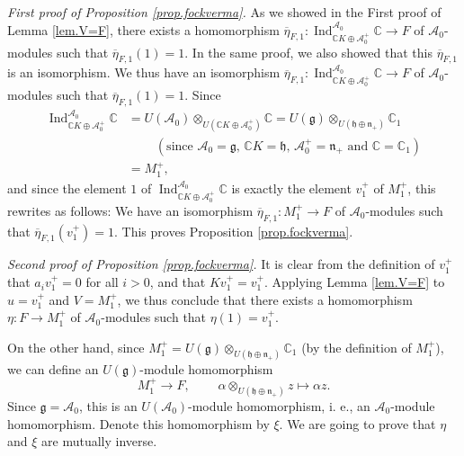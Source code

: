 \documentclass[etingof-lie.tex]{subfiles}
\begin{document}
\textit{First proof of Proposition \ref{prop.fockverma}.} As we showed in the
First proof of Lemma \ref{lem.V=F}, there exists a homomorphism $\overline
{\eta}_{F,1}:\operatorname*{Ind}\nolimits_{\mathbb{C}K\oplus\mathcal{A}%
_{0}^{+}}^{\mathcal{A}_{0}}\mathbb{C}\rightarrow F$ of $\mathcal{A}_{0}%
$-modules such that $\overline{\eta}_{F,1}\left(  1\right)  =1$. In the same
proof, we also showed that this $\overline{\eta}_{F,1}$ is an isomorphism. We
thus have an isomorphism $\overline{\eta}_{F,1}:\operatorname*{Ind}%
\nolimits_{\mathbb{C}K\oplus\mathcal{A}_{0}^{+}}^{\mathcal{A}_{0}}%
\mathbb{C}\rightarrow F$ of $\mathcal{A}_{0}$-modules such that $\overline
{\eta}_{F,1}\left(  1\right)  =1$. Since%
\begin{align*}
\operatorname*{Ind}\nolimits_{\mathbb{C}K\oplus\mathcal{A}_{0}^{+}%
}^{\mathcal{A}_{0}}\mathbb{C}  &  =U\left(  \mathcal{A}_{0}\right)
\otimes_{U\left(  \mathbb{C}K\oplus\mathcal{A}_{0}^{+}\right)  }%
\mathbb{C}=U\left(  \mathfrak{g}\right)  \otimes_{U\left(  \mathfrak{h}%
\oplus\mathfrak{n}_{+}\right)  }\mathbb{C}_{1}\\
&  \ \ \ \ \ \ \ \ \ \ \left(  \text{since }\mathcal{A}_{0}=\mathfrak{g}%
\text{, }\mathbb{C}K=\mathfrak{h}\text{, }\mathcal{A}_{0}^{+}=\mathfrak{n}%
_{+}\text{ and }\mathbb{C}=\mathbb{C}_{1}\right) \\
&  =M_{1}^{+},
\end{align*}
and since the element $1$ of $\operatorname*{Ind}\nolimits_{\mathbb{C}%
K\oplus\mathcal{A}_{0}^{+}}^{\mathcal{A}_{0}}\mathbb{C}$ is exactly the
element $v_{1}^{+}$ of $M_{1}^{+}$, this rewrites as follows: We have an
isomorphism $\overline{\eta}_{F,1}:M_{1}^{+}\rightarrow F$ of $\mathcal{A}%
_{0}$-modules such that $\overline{\eta}_{F,1}\left(  v_{1}^{+}\right)  =1$.
This proves Proposition \ref{prop.fockverma}.

\textit{Second proof of Proposition \ref{prop.fockverma}.} It is clear from
the definition of $v_{1}^{+}$ that $a_{i}v_{1}^{+}=0$ for all $i>0$, and that
$Kv_{1}^{+}=v_{1}^{+}$. Applying Lemma \ref{lem.V=F} to $u=v_{1}^{+}$ and
$V=M_{1}^{+}$, we thus conclude that there exists a homomorphism
$\eta:F\rightarrow M_{1}^{+}$ of $\mathcal{A}_{0}$-modules such that
$\eta\left(  1\right)  =v_{1}^{+}$.

On the other hand, since $M_{1}^{+}=U\left(  \mathfrak{g}\right)
\otimes_{U\left(  \mathfrak{h}\oplus\mathfrak{n}_{+}\right)  }\mathbb{C}_{1}$
(by the definition of $M_{1}^{+}$), we can define an $U\left(  \mathfrak{g}%
\right)  $-module homomorphism%
\[
M_{1}^{+}\rightarrow F,\ \ \ \ \ \ \ \ \ \ \alpha\otimes_{U\left(
\mathfrak{h}\oplus\mathfrak{n}_{+}\right)  }z\mapsto\alpha z.
\]
Since $\mathfrak{g}=\mathcal{A}_{0}$, this is an $U\left(  \mathcal{A}%
_{0}\right)  $-module homomorphism, i. e., an $\mathcal{A}_{0}$-module
homomorphism. Denote this homomorphism by $\xi$. We are going to prove that
$\eta$ and $\xi$ are mutually inverse.
\end{document}
